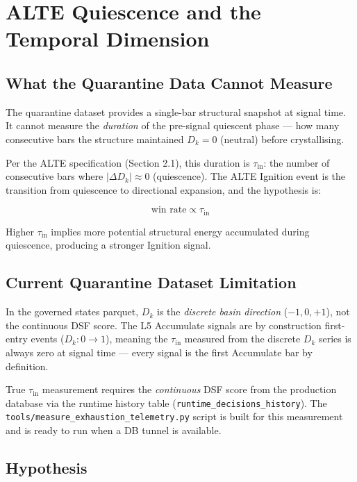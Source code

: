 \documentclass[11pt, a4paper]{article}
\newcommand{\Dk}{D_k}
\newcommand{\tauin}{\tau_{\mathrm{in}}}
\theoremstyle{definition}
\begin{document}
\section{ALTE Quiescence and the Temporal Dimension}

\subsection{What the Quarantine Data Cannot Measure}

The quarantine dataset provides a single-bar structural snapshot at signal time.
It cannot measure the \emph{duration} of the pre-signal quiescent phase —
how many consecutive bars the structure maintained $\Dk = 0$ (neutral) before
crystallising.

Per the ALTE specification (Section 2.1), this duration is $\tauin$:
the number of consecutive bars where $|\Delta D_k| \approx 0$ (quiescence).
The ALTE Ignition event is the transition from quiescence to directional
expansion, and the hypothesis is:

\[
  \text{win rate} \propto \tauin
\]

Higher $\tauin$ implies more potential structural energy accumulated during
quiescence, producing a stronger Ignition signal.

\subsection{Current Quarantine Dataset Limitation}

In the governed states parquet, $\Dk$ is the \emph{discrete basin direction}
($-1, 0, +1$), not the continuous DSF score.
The L5 Accumulate signals are by construction first-entry events ($\Dk: 0 \to 1$),
meaning the $\tauin$ measured from the discrete $\Dk$ series is always zero at
signal time — every signal is the first Accumulate bar by definition.

True $\tauin$ measurement requires the \emph{continuous} DSF score from the
production database via the runtime history table (\texttt{runtime\_decisions\_history}).
The \texttt{tools/measure\_exhaustion\_telemetry.py} script is built for this
measurement and is ready to run when a DB tunnel is available.

\subsection{Hypothesis}
\end{document}
